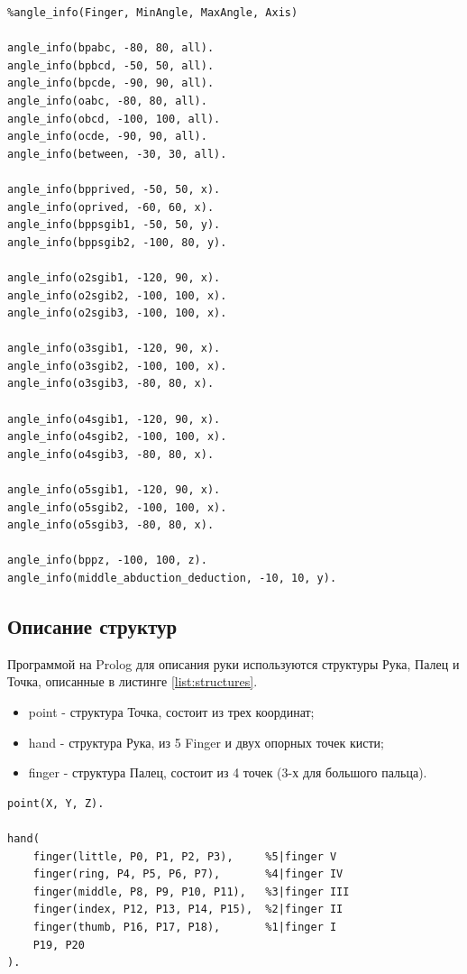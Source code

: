 \begin{lstlisting}[caption=Знания об амплитудах углов и проверяемых осях, label=facts:angleinfo]
%info about angle limits in degrees for fingers and axis
%angle_info(Finger, MinAngle, MaxAngle, Axis)

angle_info(bpabc, -80, 80, all).
angle_info(bpbcd, -50, 50, all).
angle_info(bpcde, -90, 90, all).
angle_info(oabc, -80, 80, all).
angle_info(obcd, -100, 100, all).
angle_info(ocde, -90, 90, all).
angle_info(between, -30, 30, all).

angle_info(bpprived, -50, 50, x).
angle_info(oprived, -60, 60, x).
angle_info(bppsgib1, -50, 50, y).
angle_info(bppsgib2, -100, 80, y).

angle_info(o2sgib1, -120, 90, x).
angle_info(o2sgib2, -100, 100, x).
angle_info(o2sgib3, -100, 100, x).

angle_info(o3sgib1, -120, 90, x).
angle_info(o3sgib2, -100, 100, x).
angle_info(o3sgib3, -80, 80, x).

angle_info(o4sgib1, -120, 90, x).
angle_info(o4sgib2, -100, 100, x).
angle_info(o4sgib3, -80, 80, x).

angle_info(o5sgib1, -120, 90, x).
angle_info(o5sgib2, -100, 100, x).
angle_info(o5sgib3, -80, 80, x).

angle_info(bppz, -100, 100, z).
angle_info(middle_abduction_deduction, -10, 10, y).
\end{lstlisting}

\subsection{Описание структур}
\hspace{0.6cm} Программой на Prolog для описания руки используются структуры Рука, Палец и Точка, описанные в листинге \ref{list:structures}.

\begin{itemize}
	\item point - структура Точка, состоит из трех координат;
	\item hand - структура Рука, из 5 Finger и двух опорных точек кисти;
	\item finger - структура Палец, состоит из 4 точек (3-х для большого пальца).
\end{itemize}
\begin{lstlisting}[caption=Структуры, label=list:structures]
point(X, Y, Z).

hand(
	finger(little, P0, P1, P2, P3),		%5|finger V
	finger(ring, P4, P5, P6, P7),		%4|finger IV
	finger(middle, P8, P9, P10, P11),	%3|finger III
	finger(index, P12, P13, P14, P15),	%2|finger II
	finger(thumb, P16, P17, P18),		%1|finger I
	P19, P20							
).	
\end{lstlisting}

